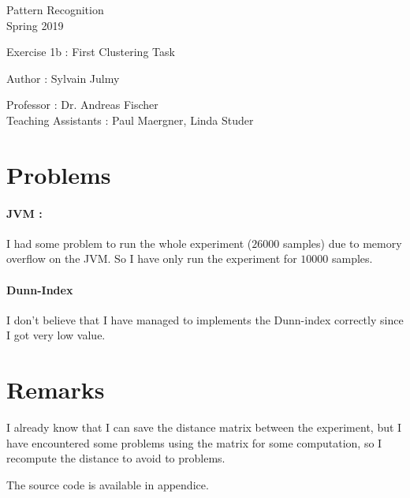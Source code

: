 \documentclass[a4paper,11pt]{report}
\date{\today}
\begin{document}
\begin{center}
\Large{
    Pattern Recognition \\
    Spring 2019
  }
  
  \noindent\makebox[\linewidth]{\rule{\linewidth}{0.4pt}}
  Exercise 1b : First Clustering Task

  \vspace*{1.4cm}

  Author : Sylvain Julmy
  \noindent\makebox[\linewidth]{\rule{\linewidth}{0.4pt}}

  \begin{flushleft}
    Professor : Dr. Andreas Fischer \\
    Teaching Assistants : Paul Maergner, Linda Studer
  \end{flushleft}

  \noindent\makebox[\linewidth]{\rule{\textwidth}{1pt}}
\end{center}

\section*{Problems}

\paragraph{JVM : } I had some problem to run the whole experiment ($26000$ samples) due to memory
overflow on the JVM. So I have only run the experiment for $10000$ samples.

\paragraph{Dunn-Index} I don't believe that I have managed to implements the
Dunn-index correctly since I got very low value.

\section*{Remarks}

I already know that I can save the distance matrix between the experiment, but I
have encountered some problems using the matrix for some computation, so I
recompute the distance to avoid to problems.

The source code is available in appendice.

\newpage
\end{document}
